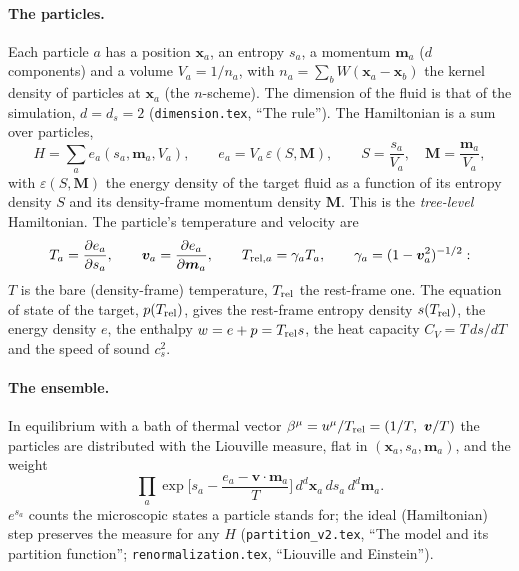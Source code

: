 \documentclass[11pt,aps,preprint,nofootinbib,superscriptaddress,tightenlines]{revtex4-2}
\def\st{\begin{equation}}
\def\stp{\end{equation}}
\let\oldparagraph\paragraph
\renewcommand{\paragraph}{\par\bigskip\oldparagraph}
\begin{document}
\paragraph{The particles.}  Each particle $a$ has a position $\bm x_a$, an entropy $s_a$, a momentum $\bm m_a$ ($d$ components) and a volume
$V_a=1/n_a$, with $n_a=\sum_bW(\bm x_a-\bm x_b)$ the kernel density of particles at $\bm x_a$ (the $n$-scheme).  The dimension of the fluid is that of
the simulation, $d=d_s=2$ (\nolinkurl{dimension.tex}, ``The rule'').  The Hamiltonian is a sum over particles,
\st
H=\sum_ae_a(s_a,\bm m_a,V_a),\qquad e_a=V_a\,\varepsilon(S,\bm M),\qquad S=\frac{s_a}{V_a},\quad \bm M=\frac{\bm m_a}{V_a},
\label{eq:H}
\stp
with $\varepsilon(S,\bm M)$ the energy density of the target fluid as a function of its entropy density $S$ and its density-frame momentum
density $\bm M$.  This is the \emph{tree-level} Hamiltonian.  The particle's temperature and velocity are
\st
T_a=\frac{\partial e_a}{\partial s_a},\qquad \bm v_a=\frac{\partial e_a}{\partial\bm m_a},\qquad T_{{\rm rel},a}=\gamma_aT_a,\qquad \gamma_a=(1-\bm v_a^2)^{-1/2} :
\stp
$T$ is the bare (density-frame) temperature, $T_{\rm rel}$ the rest-frame one.  The equation of state of the target, $p(T_{\rm rel})$, gives
the rest-frame entropy density $s(T_{\rm rel})$, the energy density $e$, the enthalpy $w=e+p=T_{\rm rel}s$, the heat capacity $C_V=T\,ds/dT$ and
the speed of sound $c_s^2$.

\paragraph{The ensemble.}  In equilibrium with a bath of thermal vector $\beta^\mu=u^\mu/T_{\rm rel}=(1/T,\ \bm v/T)$ the particles are distributed
with the Liouville measure, flat in $(\bm x_a,s_a,\bm m_a)$, and the weight
\st
\prod_a\exp\Big[s_a-\frac{e_a-\bm v\cdot\bm m_a}{T}\Big]\,d^d\bm x_a\,ds_a\,d^d\bm m_a .
\label{eq:weight}
\stp
$e^{s_a}$ counts the microscopic states a particle stands for; the ideal (Hamiltonian) step preserves the measure for any $H$
(\nolinkurl{partition_v2.tex}, ``The model and its partition function''; \nolinkurl{renormalization.tex}, ``Liouville and Einstein'').
\end{document}
